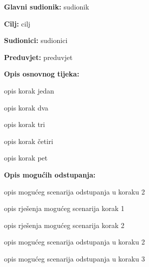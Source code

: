 \begin{packed_enum}
\begin{packed_item}
\begin{packed_item}
						\end{packed_item}
					\end{packed_item}
					
					\noindent {}
					\begin{packed_item}
						
						\item \textbf{Glavni sudionik: }sudionik
						\item  \textbf{Cilj:} cilj
						\item  \textbf{Sudionici:} sudionici
						\item  \textbf{Preduvjet:} preduvjet
						\item  \textbf{Opis osnovnog tijeka:}
						
						\item[] \begin{packed_enum}
							
							\item opis korak jedan
							\item opis korak dva
							\item opis korak tri
							\item opis korak četiri
							\item opis korak pet
						\end{packed_enum}
						
						\item  \textbf{Opis mogućih odstupanja:}
						
						\item[] \begin{packed_item}
							
							\item[2.a] opis mogućeg scenarija odstupanja u koraku 2
							\item[] \begin{packed_enum}
								
								\item opis rješenja mogućeg scenarija korak 1
								\item opis rješenja mogućeg scenarija korak 2
								
							\end{packed_enum}
							\item[2.b] opis mogućeg scenarija odstupanja u koraku 2
							\item[3.a] opis mogućeg scenarija odstupanja  u koraku 3
							
						\end{packed_item}
					\end{packed_item}
				

\end{packed_enum}
